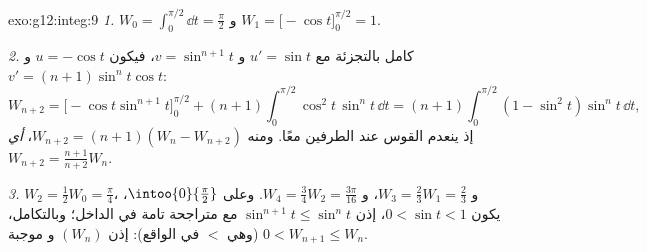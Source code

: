 \begin{solution}{exo:g12:integ:9}
\emph{1.} $W_0 = \int_0^{\pi/2} \dd t = \frac{\pi}{2}$ و
$W_1 = \bigl[-\cos t\bigr]_0^{\pi/2} = 1$.

\emph{2.} كامل بالتجزئة مع $u' = \sin t$ و $v = \sin^{n+1} t$، فيكون
$u = -\cos t$ و $v' = (n+1)\sin^n t \cos t$:
\[
W_{n+2} = \bigl[-\cos t \sin^{n+1} t\bigr]_0^{\pi/2}
+ (n+1)\int_0^{\pi/2} \cos^2 t\,\sin^n t\,\dd t
= (n+1)\int_0^{\pi/2} (1 - \sin^2 t)\sin^n t\,\dd t,
\]
إذ ينعدم القوس عند الطرفين معًا. ومنه
$W_{n+2} = (n+1)(W_n - W_{n+2})$، \emph{أي}
$W_{n+2} = \frac{n+1}{n+2} W_n$.

\emph{3.} $W_2 = \frac12 W_0 = \frac{\pi}{4}$، و
$W_3 = \frac23 W_1 = \frac23$، و
$W_4 = \frac34 W_2 = \frac{3\pi}{16}$.
وعلى $\intoo{0}{\frac\pi2}$، يكون $0 < \sin t < 1$، إذن
$\sin^{n+1} t \leq \sin^n t$ مع متراجحة تامة في الداخل؛
وبالتكامل، $0 < W_{n+1} \leq W_n$ (وهي $<$ في الواقع): إذن $(W_n)$  و
موجبة.
\end{solution}


